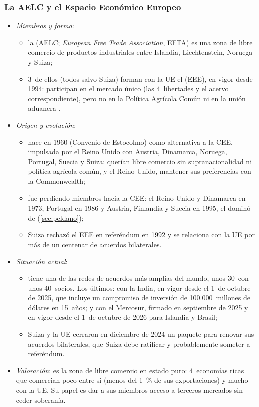\documentclass[11pt]{article}
\begin{document}
\subsubsection{La AELC y el Espacio Económico Europeo}\label{sec:aelc}

\begin{itemize}
\item \emph{Miembros y forma}:
  \begin{itemize}
  \item la  (AELC; \emph{European Free Trade Association}, EFTA) es una zona de libre comercio de productos industriales entre Islandia, Liechtenstein, Noruega y Suiza;
  \item 3~de ellos (todos salvo Suiza) forman con la UE el  (EEE), en vigor desde 1994: participan en el mercado único (las 4~libertades y el acervo correspondiente), pero no en la Política Agrícola Común ni en la unión aduanera .
  \end{itemize}
\item \emph{Origen y evolución}:
  \begin{itemize}
  \item nace en 1960 (Convenio de Estocolmo) como alternativa a la CEE, impulsada por el Reino Unido con Austria, Dinamarca, Noruega, Portugal, Suecia y Suiza: querían libre comercio sin supranacionalidad ni política agrícola común, y el Reino Unido, mantener sus preferencias con la Commonwealth;
  \item fue perdiendo miembros hacia la CEE: el Reino Unido y Dinamarca en 1973, Portugal en 1986 y Austria, Finlandia y Suecia en 1995, el dominó de  (\ref{sec:peldano});
  \item Suiza rechazó el EEE en referéndum en 1992 y se relaciona con la UE por más de un centenar de acuerdos bilaterales.
  \end{itemize}
\item \emph{Situación actual}:
  \begin{itemize}
  \item tiene una de las redes de acuerdos más amplias del mundo, unos 30~con unos 40~socios\nocite{AELC2026Red}. Los últimos: con la India, en vigor desde el 1~de octubre de 2025, que incluye un compromiso de inversión de 100.000~millones de dólares en 15~años\nocite{AELC2025India}; y con el Mercosur, firmado en septiembre de 2025 y en vigor desde el 1~de octubre de 2026 para Islandia y Brasil\nocite{AELC2026Mercosur};
  \item Suiza y la UE cerraron en diciembre de 2024 un paquete para renovar sus acuerdos bilaterales, que Suiza debe ratificar y probablemente someter a referéndum.
  \end{itemize}
\item \emph{Valoración}: es la zona de libre comercio en estado puro: 4~economías ricas que comercian poco entre sí (menos del 1~\% de sus exportaciones) y mucho con la UE. Su papel es dar a sus miembros acceso a terceros mercados sin ceder soberanía.
\end{itemize}
\end{document}
